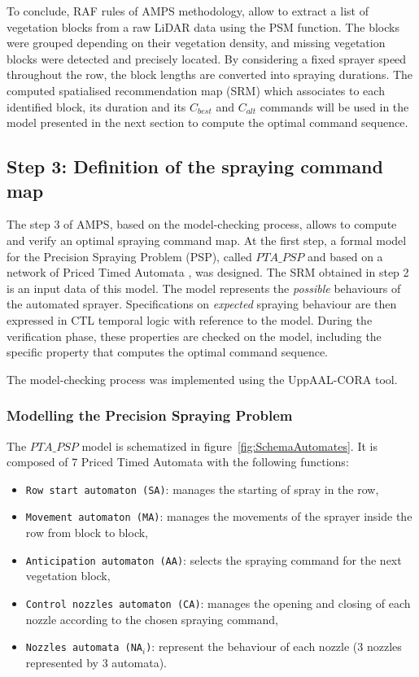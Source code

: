 \documentclass[preprint,3p,times,twocolumn]{elsarticle}
\begin{document}
To conclude, RAF rules of AMPS methodology, allow to extract a list of vegetation blocks from a raw LiDAR data using the PSM function. The blocks were grouped depending on their vegetation density, and missing vegetation blocks were detected and precisely located. By considering a fixed sprayer speed throughout the row, the block lengths are converted into spraying durations. The computed spatialised recommendation map (SRM) which associates to each identified block, its duration and its $C_{best}$ and $C_{alt}$ commands will be used in the model presented in the next section to compute the optimal command sequence.

\subsection{Step 3: Definition of the spraying command map}
\label{Verif}

The step 3 of AMPS, based on the model-checking process, allows to compute and verify an optimal spraying command map. At the first step, a formal model for the Precision Spraying Problem (PSP), called $PTA\_PSP$ and based on a network of Priced Timed Automata \cite{priced2004}, was designed. 
The SRM obtained in step 2 is an input data of this model. The model represents the \textit{possible} behaviours of the automated sprayer. Specifications on \textit{expected} spraying behaviour are then expressed in CTL temporal logic with reference to the model. During the verification phase, these properties are checked on the model, including the specific property that computes the optimal command sequence. 

The model-checking process was implemented using the UppAAL-CORA tool.   


\subsubsection{Modelling the Precision Spraying Problem} \label{sec:modellingSpraying}

The $PTA\_PSP$ model is schematized in figure~\ref{fig:SchemaAutomates}. It is composed of 7 Priced Timed Automata with the following functions:
\begin{itemize}
\item \texttt{Row start automaton (SA)}: manages the starting of spray in the row,
\item \texttt{Movement automaton (MA)}: manages the movements of the sprayer inside the row from block to block,
\item \texttt{Anticipation automaton (AA)}: selects the spraying command for the next vegetation block,
\item \texttt{Control nozzles automaton (CA)}: manages the opening and closing of each nozzle according to the chosen spraying command,
\item \texttt{Nozzles automata (NA$_i$)}: represent the behaviour of each nozzle (3 nozzles represented by 3 automata).
\end{itemize}
\end{document}
